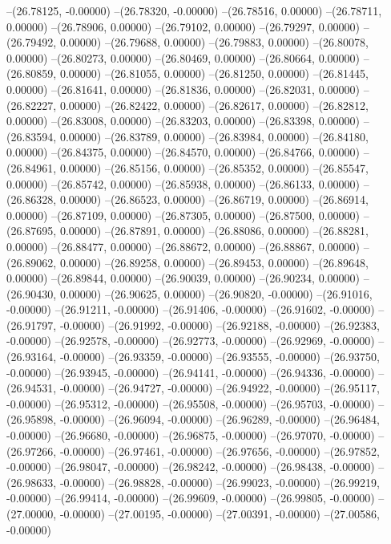 --(26.78125, -0.00000)
--(26.78320, -0.00000)
--(26.78516, 0.00000)
--(26.78711, 0.00000)
--(26.78906, 0.00000)
--(26.79102, 0.00000)
--(26.79297, 0.00000)
--(26.79492, 0.00000)
--(26.79688, 0.00000)
--(26.79883, 0.00000)
--(26.80078, 0.00000)
--(26.80273, 0.00000)
--(26.80469, 0.00000)
--(26.80664, 0.00000)
--(26.80859, 0.00000)
--(26.81055, 0.00000)
--(26.81250, 0.00000)
--(26.81445, 0.00000)
--(26.81641, 0.00000)
--(26.81836, 0.00000)
--(26.82031, 0.00000)
--(26.82227, 0.00000)
--(26.82422, 0.00000)
--(26.82617, 0.00000)
--(26.82812, 0.00000)
--(26.83008, 0.00000)
--(26.83203, 0.00000)
--(26.83398, 0.00000)
--(26.83594, 0.00000)
--(26.83789, 0.00000)
--(26.83984, 0.00000)
--(26.84180, 0.00000)
--(26.84375, 0.00000)
--(26.84570, 0.00000)
--(26.84766, 0.00000)
--(26.84961, 0.00000)
--(26.85156, 0.00000)
--(26.85352, 0.00000)
--(26.85547, 0.00000)
--(26.85742, 0.00000)
--(26.85938, 0.00000)
--(26.86133, 0.00000)
--(26.86328, 0.00000)
--(26.86523, 0.00000)
--(26.86719, 0.00000)
--(26.86914, 0.00000)
--(26.87109, 0.00000)
--(26.87305, 0.00000)
--(26.87500, 0.00000)
--(26.87695, 0.00000)
--(26.87891, 0.00000)
--(26.88086, 0.00000)
--(26.88281, 0.00000)
--(26.88477, 0.00000)
--(26.88672, 0.00000)
--(26.88867, 0.00000)
--(26.89062, 0.00000)
--(26.89258, 0.00000)
--(26.89453, 0.00000)
--(26.89648, 0.00000)
--(26.89844, 0.00000)
--(26.90039, 0.00000)
--(26.90234, 0.00000)
--(26.90430, 0.00000)
--(26.90625, 0.00000)
--(26.90820, -0.00000)
--(26.91016, -0.00000)
--(26.91211, -0.00000)
--(26.91406, -0.00000)
--(26.91602, -0.00000)
--(26.91797, -0.00000)
--(26.91992, -0.00000)
--(26.92188, -0.00000)
--(26.92383, -0.00000)
--(26.92578, -0.00000)
--(26.92773, -0.00000)
--(26.92969, -0.00000)
--(26.93164, -0.00000)
--(26.93359, -0.00000)
--(26.93555, -0.00000)
--(26.93750, -0.00000)
--(26.93945, -0.00000)
--(26.94141, -0.00000)
--(26.94336, -0.00000)
--(26.94531, -0.00000)
--(26.94727, -0.00000)
--(26.94922, -0.00000)
--(26.95117, -0.00000)
--(26.95312, -0.00000)
--(26.95508, -0.00000)
--(26.95703, -0.00000)
--(26.95898, -0.00000)
--(26.96094, -0.00000)
--(26.96289, -0.00000)
--(26.96484, -0.00000)
--(26.96680, -0.00000)
--(26.96875, -0.00000)
--(26.97070, -0.00000)
--(26.97266, -0.00000)
--(26.97461, -0.00000)
--(26.97656, -0.00000)
--(26.97852, -0.00000)
--(26.98047, -0.00000)
--(26.98242, -0.00000)
--(26.98438, -0.00000)
--(26.98633, -0.00000)
--(26.98828, -0.00000)
--(26.99023, -0.00000)
--(26.99219, -0.00000)
--(26.99414, -0.00000)
--(26.99609, -0.00000)
--(26.99805, -0.00000)
--(27.00000, -0.00000)
--(27.00195, -0.00000)
--(27.00391, -0.00000)
--(27.00586, -0.00000)

